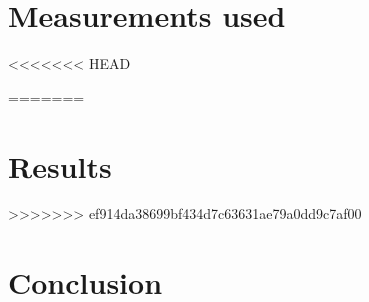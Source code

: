 \documentclass[12pt,pdflatex]{article}
\begin{document}
\section{Measurements used}



<<<<<<< HEAD

=======
\section{Results}



>>>>>>> ef914da38699bf434d7c63631ae79a0dd9c7af00
\section{Conclusion}



\label{lastpage}
\end{document}
